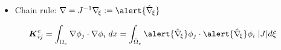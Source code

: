 \begin{frame}[t]
{
  \begin{block}{}
  \begin{itemize}    
  \item{
    Chain rule: 
    $\nabla 
    = J^{-1}\nabla_{\!\xi}
    := \alert{\hat{\nabla}_{\!\xi}}$
  }
  \end{itemize}
  \end{block}
  \begin{equation}
    \nonumber
    \bv{K}^e_{ij} =
    \int_{\Omega_e}
    \nabla \phi_j \cdot \nabla \phi_i \;dx =
    \int_{\hat{\Omega}_e}
    \alert{\hat{\nabla}_{\!\xi}} \phi_j \cdot
    \alert{\hat{\nabla}_{\!\xi}} \phi_i \;|J| d\xi
  \end{equation}
}
\end{frame}
